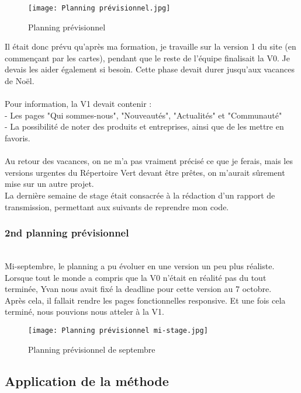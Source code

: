 \begin{figure}[H]
    \centering
    \texttt{[image: Planning prévisionnel.jpg]}
    \caption{Planning prévisionnel}
\end{figure}

Il était donc prévu qu'après ma formation, je travaille sur la version 1 du site (en commençant par les cartes), 
pendant que le reste de l'équipe finalisait la V0. Je devais les aider également si besoin. Cette phase devait durer jusqu'aux vacances de Noël.
\\\\Pour information, la V1 devait contenir : \\
- Les pages "Qui sommes-nous", "Nouveautés", "Actualités" et "Communauté"\\
- La possibilité de noter des produits et entreprises, ainsi que de les mettre en favoris.
\\\\
Au retour des vacances, on ne m'a pas vraiment précisé ce que je ferais, mais les versions urgentes du Répertoire Vert devant être prêtes, on m'aurait sûrement mise sur un autre projet.
\\
La dernière semaine de stage était consacrée à la rédaction d'un rapport de transmission, permettant aux suivants de reprendre mon code.

\subsubsection{2nd planning prévisionnel}
~\\
Mi-septembre, le planning a pu évoluer en une version un peu plus réaliste.\\
Lorsque tout le monde a compris que la V0 n'était en réalité pas du tout terminée, Yvan nous avait fixé la deadline pour cette version au 7 octobre.
\\Après cela, il fallait rendre les pages fonctionnelles responsive. Et une fois cela terminé, nous pouvions nous atteler à la V1.

\begin{figure}[H]
    \centering
    \texttt{[image: Planning prévisionnel mi-stage.jpg]}
    \caption{Planning prévisionnel de septembre}
\end{figure}

\pagebreak
\subsection{Application de la méthode}

